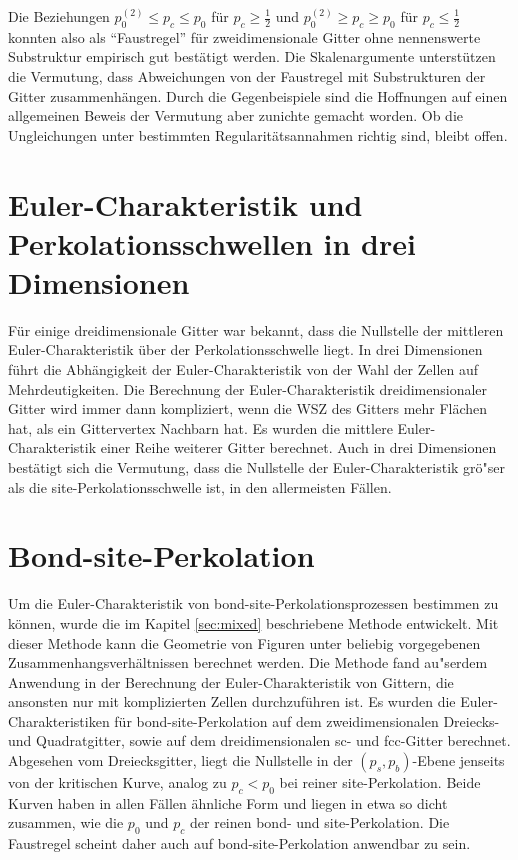 Die Beziehungen $p_0^{(2)}\leq p_c \leq p_0$ f\"ur $p_c\geq \frac{1}{2}$ und $p_0^{(2)}\geq p_c \geq p_0$ f\"ur $p_c\leq \frac{1}{2}$ konnten also als ``Faustregel'' f\"ur zweidimensionale Gitter ohne nennenswerte Substruktur empirisch gut best\"atigt werden. Die Skalenargumente unterst\"utzen die Vermutung, dass Abweichungen von der Faustregel mit Substrukturen der Gitter zusammenh\"angen. Durch die Gegenbeispiele sind die Hoffnungen auf einen allgemeinen Beweis der Vermutung aber zunichte gemacht worden. Ob die Ungleichungen unter bestimmten Regularit\"atsannahmen richtig sind, bleibt offen.

\section*{Euler-Charakteristik und Perkolationsschwellen in drei Dimensionen}
F\"ur einige dreidimensionale Gitter war bekannt, dass die Nullstelle der mittleren Euler-Charakteristik \"uber der Perkolationsschwelle liegt. 
In drei Dimensionen f\"uhrt die Abh\"angigkeit der Euler-Charakteristik von der Wahl der Zellen auf Mehrdeutigkeiten. Die Berechnung der Euler-Charakteristik dreidimensionaler Gitter wird immer dann kompliziert, wenn die WSZ des Gitters mehr Fl\"achen hat, als ein Gittervertex Nachbarn hat.  
Es wurden die mittlere Euler-Charakteristik einer Reihe weiterer Gitter berechnet. Auch in drei Dimensionen best\"atigt sich die Vermutung, dass die Nullstelle der Euler-Charakteristik gr\"o"ser als die site-Perkolationsschwelle ist, in den allermeisten F\"allen. 
\section*{Bond-site-Perkolation}
Um die Euler-Charakteristik von bond-site-Perkolationsprozessen bestimmen zu k\"onnen, wurde die im Kapitel \ref{sec:mixed} beschriebene Methode entwickelt. Mit dieser Methode kann die Geometrie von Figuren unter beliebig vorgegebenen Zusammenhangsverh\"altnissen berechnet werden. Die Methode fand au"serdem Anwendung in der Berechnung der Euler-Charakteristik von Gittern, die ansonsten nur mit komplizierten Zellen durchzuf\"uhren ist. Es wurden die Euler-Charakteristiken f\"ur bond-site-Perkolation auf dem zweidimensionalen Dreiecks- und Quadratgitter, sowie auf dem dreidimensionalen sc- und fcc-Gitter berechnet. Abgesehen vom Dreiecksgitter, liegt die Nullstelle in der $(p_s,p_b)$-Ebene jenseits von der kritischen Kurve, analog zu $p_c<p_0$ bei reiner site-Perkolation. Beide Kurven haben in allen F\"allen \"ahnliche Form und liegen in etwa so dicht zusammen, wie die $p_0$ und $p_c$ der reinen bond- und site-Perkolation. Die Faustregel scheint daher auch auf bond-site-Perkolation anwendbar zu sein.


